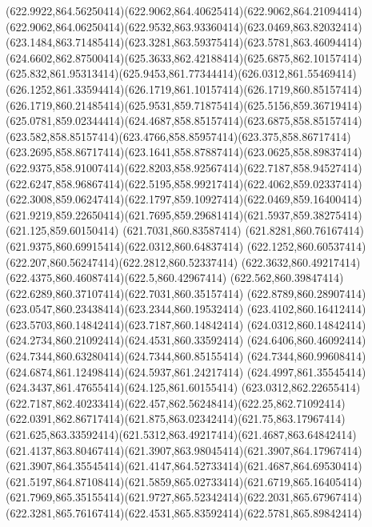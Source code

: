 {{	\curveto(622.9922,864.56250414)(622.9062,864.40625414)(622.9062,864.21094414)
	\curveto(622.9062,864.06250414)(622.9532,863.93360414)(623.0469,863.82032414)
	\curveto(623.1484,863.71485414)(623.3281,863.59375414)(623.5781,863.46094414)
	\curveto(624.6602,862.87500414)(625.3633,862.42188414)(625.6875,862.10157414)
	\curveto(625.832,861.95313414)(625.9453,861.77344414)(626.0312,861.55469414)
	\curveto(626.1252,861.33594414)(626.1719,861.10157414)(626.1719,860.85157414)
	\curveto(626.1719,860.21485414)(625.9531,859.71875414)(625.5156,859.36719414)
	\curveto(625.0781,859.02344414)(624.4687,858.85157414)(623.6875,858.85157414)
	\curveto(623.582,858.85157414)(623.4766,858.85957414)(623.375,858.86717414)
	\curveto(623.2695,858.86717414)(623.1641,858.87887414)(623.0625,858.89837414)
	\curveto(622.9375,858.91007414)(622.8203,858.92567414)(622.7187,858.94527414)
	\curveto(622.6247,858.96867414)(622.5195,858.99217414)(622.4062,859.02337414)
	\curveto(622.3008,859.06247414)(622.1797,859.10927414)(622.0469,859.16400414)
	\curveto(621.9219,859.22650414)(621.7695,859.29681414)(621.5937,859.38275414)
	\lineto(621.125,859.60150414)
	\lineto(621.7031,860.83587414)
	\curveto(621.8281,860.76167414)(621.9375,860.69915414)(622.0312,860.64837414)
	\curveto(622.1252,860.60537414)(622.207,860.56247414)(622.2812,860.52337414)
	\curveto(622.3632,860.49217414)(622.4375,860.46087414)(622.5,860.42967414)
	\curveto(622.562,860.39847414)(622.6289,860.37107414)(622.7031,860.35157414)
	\curveto(622.8789,860.28907414)(623.0547,860.23438414)(623.2344,860.19532414)
	\curveto(623.4102,860.16412414)(623.5703,860.14842414)(623.7187,860.14842414)
	\curveto(624.0312,860.14842414)(624.2734,860.21092414)(624.4531,860.33592414)
	\curveto(624.6406,860.46092414)(624.7344,860.63280414)(624.7344,860.85155414)
	\curveto(624.7344,860.99608414)(624.6874,861.12498414)(624.5937,861.24217414)
	\curveto(624.4997,861.35545414)(624.3437,861.47655414)(624.125,861.60155414)
	\lineto(623.0312,862.22655414)
	\curveto(622.7187,862.40233414)(622.457,862.56248414)(622.25,862.71092414)
	\curveto(622.0391,862.86717414)(621.875,863.02342414)(621.75,863.17967414)
	\curveto(621.625,863.33592414)(621.5312,863.49217414)(621.4687,863.64842414)
	\curveto(621.4137,863.80467414)(621.3907,863.98045414)(621.3907,864.17967414)
	\curveto(621.3907,864.35545414)(621.4147,864.52733414)(621.4687,864.69530414)
	\curveto(621.5197,864.87108414)(621.5859,865.02733414)(621.6719,865.16405414)
	\curveto(621.7969,865.35155414)(621.9727,865.52342414)(622.2031,865.67967414)
	\curveto(622.3281,865.76167414)(622.4531,865.83592414)(622.5781,865.89842414)
}}
